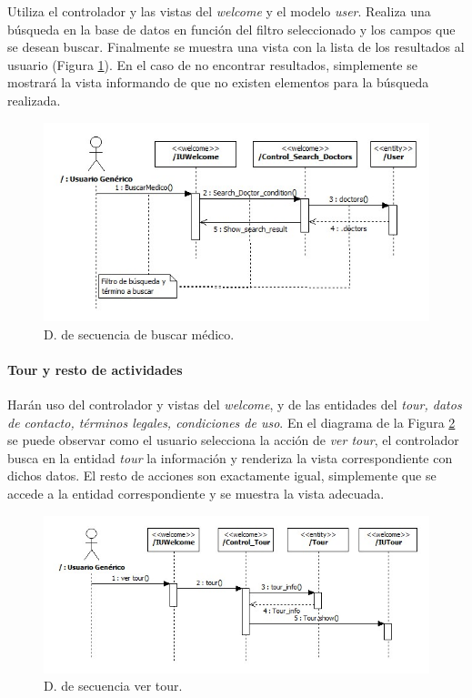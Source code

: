 					Utiliza el controlador y las vistas del \textit{welcome} y el modelo \textit{user}. Realiza una búsqueda en la base de datos en función del filtro seleccionado y los campos que se desean buscar. Finalmente se muestra una vista con la lista de los resultados al usuario (Figura \ref{fig:cont_user_search_doc}). En el caso de no encontrar resultados, simplemente se mostrará la vista informando de que no existen elementos para la búsqueda realizada.
					
					\begin{figure}[H]
					  \centering
					    \includegraphics[width=12cm]{img/jpg/secuencia/24_user_search_doc.jpg}
					  \caption{D. de secuencia de buscar médico.}
					  \label{fig:cont_user_search_doc}
					\end{figure}
					
				
				\paragraph{Tour y resto de actividades} %
				\label{subp:tour_y_resto_de_actividades}
				
					Harán uso del controlador y vistas del \textit{welcome}, y de las entidades del \textit{tour, datos de contacto, términos legales, condiciones de uso}. En el diagrama de la Figura \ref{fig:cont_user_tour} se puede observar como el usuario selecciona la acción de \textit{ver tour}, el controlador busca en la entidad \textit{tour} la información y renderiza la vista correspondiente con dichos datos. El resto de acciones son exactamente igual, simplemente que se accede a la entidad correspondiente y se muestra la vista adecuada.
					
					\begin{figure}[H]
					  \centering
					    \includegraphics[width=13cm]{img/jpg/secuencia/23_user_tour.jpg}
					  \caption{D. de secuencia ver tour.}
					  \label{fig:cont_user_tour}
					\end{figure}
				
